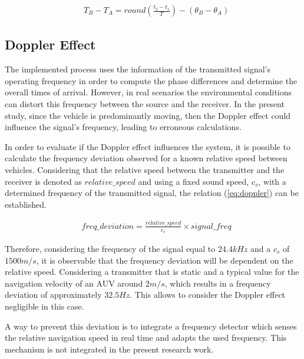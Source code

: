 \begin{eqnarray}
	& T_B - T_A = round(\frac{t_2-t_1}{T}) - (\theta_B - \theta_A)
	\label{eq:phase-amb}
\end{eqnarray}

\subsection{Doppler Effect}

The implemented process uses the information of the transmitted signal's operating frequency in order to compute the phase differences and determine the overall times of arrival. However, in real scenarios the environmental conditions can distort this frequency between the source and the receiver. In the present study, since the vehicle is predominantly moving, then the Doppler effect could influence the signal's frequency, leading to erroneous calculations.

In order to evaluate if the Doppler effect influences the system, it is possible to calculate the frequency deviation observed for a known relative speed between vehicles. Considering that the relative speed between the transmitter and the receiver is denoted as $relative\_speed$ and using a fixed sound speed, $c_s$, with a determined frequency of the transmitted signal, the relation (\ref{eq:doppler}) can be established. 

\begin{eqnarray}
	&freq\_deviation = \frac{relative\_speed}{c_s} \times signal\_freq
	\label{eq:doppler}
\end{eqnarray}

Therefore, considering the frequency of the signal equal to $24.4kHz$ and a $c_s$ of $1500 m/s$, it is observable that the frequency deviation will be dependent on the relative speed. Considering a transmitter that is static and a typical value for the navigation velocity of an AUV around $2 m/s$, which results in a frequency deviation of approximately $32.5Hz$. This allows to consider the Doppler effect negligible in this case.

A way to prevent this deviation is to integrate a frequency detector which senses the relative navigation speed in real time and adapts the used frequency. This mechanism is not integrated in the present research work.